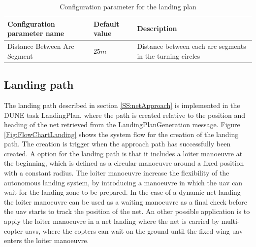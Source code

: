 \begin{table}
\centering
\begin{tabular}{| p{5cm} | p{1cm} | p{5cm} |}
\hline
\textbf{Configuration parameter name}	& \textbf{Default value}	& \textbf{Description} \\ \hline
Distance Between Arc Segment			& $ 25 m$					& Distance between each arc segments in the turning circles \\ \hline
\end{tabular}
\caption{Configuration parameter for the landing plan}
\label{Tb:LandingPlanParameter}
\end{table}
\subsection{Landing path}
The landing path described in section \ref{SS:netApproach} is implemented in the DUNE task LandingPlan, where the path is created relative to the position and heading of the net retrieved from the LandingPlanGeneration message. Figure \ref{Fig:FlowChartLanding} shows the system flow for the creation of the landing path. The creation is trigger when the approach path has successfully been created. A option for the landing path is that it includes a loiter manoeuvre at the beginning, which is defined as a circular manoeuvre around a fixed position with a constant radius. The loiter manoeuvre increase the flexibility of the autonomous landing system, by introducing a manoeuvre in which the \gls{uav} can wait for the landing zone to be prepared. In the case of a dynamic net landing the loiter manoeuvre can be used as a waiting manoeuvre as a final check before the \gls{uav} starts to track the position of the net. An other possible application is to apply the loiter manoeuvre in a net landing where the net is carried by multi-copter \glspl{uav}, where the copters can wait on the ground until the fixed wing \gls{uav} enters the loiter manoeuvre.
